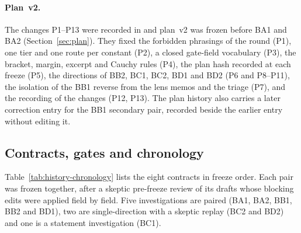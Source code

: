 \paragraph{Plan~v2.} The changes P1--P13 were recorded in
 and plan~v2 was frozen before BA1 and BA2
(Section~\ref{sec:plan}). They fixed the forbidden phrasings of the round (P1),
one tier and one route per constant (P2), a closed gate-field vocabulary (P3),
the bracket, margin, excerpt and Cauchy rules (P4), the plan hash recorded at
each freeze (P5), the directions of BB2, BC1, BC2, BD1 and BD2 (P6 and
P8--P11), the isolation of the BB1 reverse from the lens memos and the
triage (P7), and the recording of the changes (P12, P13). The plan history
also carries a later correction entry for the BB1 secondary pair, recorded
beside the earlier entry without editing it.

\subsection{Contracts, gates and chronology}
\label{sec:history-chronology}
Table~\ref{tab:history-chronology} lists the eight contracts in freeze order.
Each pair was frozen together, after a skeptic pre-freeze review of its
drafts whose blocking edits were applied field by field. Five
investigations are paired (BA1, BA2, BB1, BB2 and BD1), two are
single-direction with a skeptic replay (BC2 and BD2) and one is a statement
investigation (BC1).

